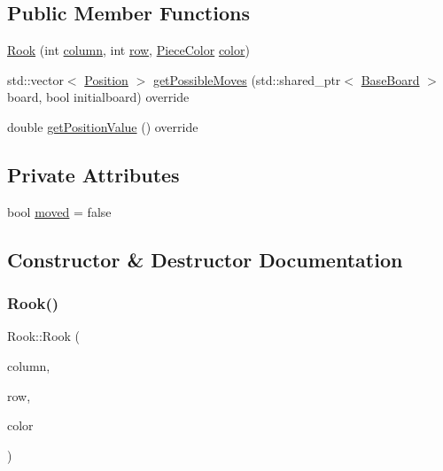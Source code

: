 \subsection*{Public Member Functions}
\begin{DoxyCompactItemize}
\item 
\hyperlink{class_rook_a76901ac8ae7beefdfdb70e5f2a207d85}{Rook} (int \hyperlink{class_piece_aa8f39e11280395103164f6ae07398c82}{column}, int \hyperlink{class_piece_ac6ef7c474f20562cb629c2452ce0631d}{row}, \hyperlink{_piece_8h_ad7595c48bb74c0dd2a7648712a2d4985}{Piece\+Color} \hyperlink{class_piece_a8dfe0501fe95a1a7618cf5ad3b9fda69}{color})
\item 
std\+::vector$<$ \hyperlink{struct_position}{Position} $>$ \hyperlink{class_rook_a631fce9b569ccf40b5b27cc6cc13cd93}{get\+Possible\+Moves} (std\+::shared\+\_\+ptr$<$ \hyperlink{class_base_board}{Base\+Board} $>$ board, bool initialboard) override
\item 
double \hyperlink{class_rook_ab1d83e6acb838249647f1f5fa7d17f41}{get\+Position\+Value} () override
\end{DoxyCompactItemize}
\subsection*{Private Attributes}
\begin{DoxyCompactItemize}
\item 
bool \hyperlink{class_rook_a2066de8a5df66bf3b8089d9d33e079ab}{moved} = false
\end{DoxyCompactItemize}


\subsection{Constructor \& Destructor Documentation}
\mbox{\label{class_rook_a76901ac8ae7beefdfdb70e5f2a207d85}} 
\subsubsection{\texorpdfstring{Rook()}{Rook()}}
{\footnotesize\ttfamily Rook\+::\+Rook (\begin{DoxyParamCaption}\item[{int}]{column,  }\item[{int}]{row,  }\item[{\hyperlink{_piece_8h_ad7595c48bb74c0dd2a7648712a2d4985}{Piece\+Color}}]{color }\end{DoxyParamCaption})\hspace{0.3cm}{\ttfamily [inline]}}



